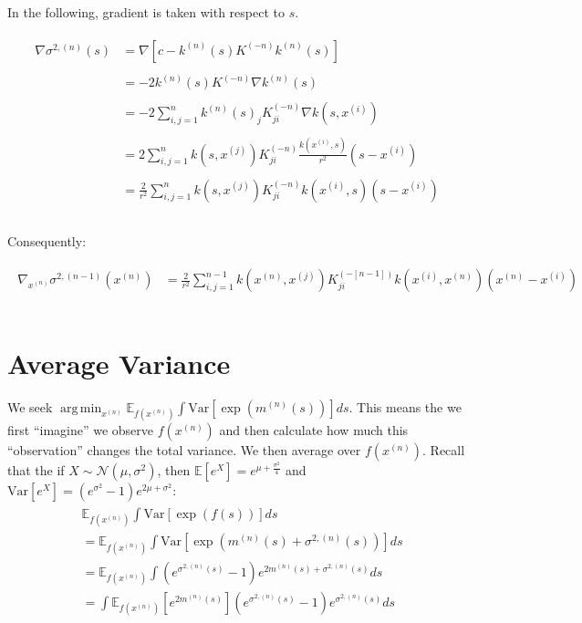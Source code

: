 \documentclass[paper=a4, fontsize=11pt]{scrartcl} %
\DeclareMathOperator*{\argmin}{arg\,min}
\numberwithin{equation}{section} %
\numberwithin{figure}{section} %
\numberwithin{table}{section} %
\newcommand{\en}{\mathbb{E}_{f(\xn)}}
\newcommand{\var}{\text{Var}}
\newcommand{\gxn}{\nabla_{x^{(n)}}} %
\newcommand{\xn}{x^{(n)}} %
\newcommand{\xj}{x^{(j)}}
\newcommand{\xii}{x^{(i)}}
\newcommand{\mn}{m^{(n)}}
\newcommand{\kn}{k^{(n)}}
\newcommand{\Kinvn}{K^{(-n)}} %
\newcommand{\Kinvnm}{K^{(-[n-1])}}
\newcommand{\sqn}{\sigma ^{2 , (n)}     }
\newcommand{\signxn}{\sigma^{2, (n-1)} (\xn)}
\begin{document}
In the following, gradient is taken with respect to $s$.

\begin{align}
 \begin{split}
  \nabla \sqn (s) &= \nabla [ c - \kn(s) \Kinvn \kn(s)]\\\\
%
%
%
&= -2 \kn(s) \Kinvn \nabla\kn(s)\\\\
%
%
%
&= -2 \sum_{i,j=1}^{n} \kn(s)_j \Kinvn_{ji} \nabla k (s, \xii )\\\\
%
%
%
&= 2 \sum_{i,j=1}^{n} k(s,\xj) \Kinvn_{ji} \frac{k(\xii ,s)}{r^2} (s-\xii)\\\\
%
%
%
&= \frac{2}{r^2} \sum_{i,j=1}^{n} k(s,\xj) \Kinvn_{ji} k(\xii ,s) (s-\xii)\\\\
 \end{split}
\end{align}

Consequently:

\begin{align}
 \begin{split}
  \gxn \signxn &= \frac{2}{r^2} \sum_{i,j=1}^{n-1} k(\xn,\xj) \Kinvnm_{ji} k(\xii ,\xn) (\xn-\xii)\\\\
 \end{split}
\end{align}


%

\section{Average Variance}
We seek $\argmin_{\xn} \en\int  \var[ \exp( \mn(s) )] ds$. This means the we first ``imagine'' we observe $f(\xn)$ and
then calculate how much this ``observation'' changes the total variance. We then average over $f(\xn)$.
Recall that the if $X \sim \mathcal{N}(\mu, \sigma^2)$, then $\mathbb{E}[e^X] = e^{\mu + \frac{\sigma^2}{4}}$ and 
$\var[e^X] = (e^{\sigma^2} - 1) e^{2\mu + \sigma^2}$:
\begin{align}
\begin{split}
%
&\en\int  \var[ \exp( f(s) )] ds  \\
%
&=\en\int  \var[ \exp( \mn(s) + \sqn(s) )] ds  \\
&=\en\int (e^{\sqn(s)} -1) e^{2\mn(s)+\sqn(s)}ds\\
%
%
&=\int \en[e^{2\mn(s)}] (e^{\sqn(s)} -1) e^{\sqn(s)}ds\\
\end{split}
\end{align}
\end{document}
